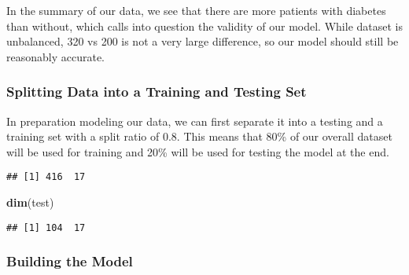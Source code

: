 \documentclass[
]{article}
\newenvironment{Shaded}{}{}
\newcommand{\DataTypeTok}[1]{\textcolor[rgb]{0.56,0.13,0.00}{#1}}
\newcommand{\DecValTok}[1]{\textcolor[rgb]{0.25,0.63,0.44}{#1}}
\newcommand{\FloatTok}[1]{\textcolor[rgb]{0.25,0.63,0.44}{#1}}
\newcommand{\KeywordTok}[1]{\textcolor[rgb]{0.00,0.44,0.13}{\textbf{#1}}}
\newcommand{\NormalTok}[1]{#1}
\newcommand{\OperatorTok}[1]{\textcolor[rgb]{0.40,0.40,0.40}{#1}}
\newcommand{\StringTok}[1]{\textcolor[rgb]{0.25,0.44,0.63}{#1}}
\begin{document}
In the summary of our data, we see that there are more patients with
diabetes than without, which calls into question the validity of our
model. While dataset is unbalanced, 320 vs 200 is not a very large
difference, so our model should still be reasonably accurate.

\hypertarget{header-n952}{%
\subsubsection{Splitting Data into a Training and Testing
Set}\label{header-n952}}

In preparation modeling our data, we can first separate it into a
testing and a training set with a split ratio of 0.8. This means that
80\% of our overall dataset will be used for training and 20\% will be
used for testing the model at the end.

\begin{Shaded}
\end{Shaded}

\begin{verbatim}
## [1] 416  17
\end{verbatim}

\begin{Shaded}
\begin{Highlighting}[]
\KeywordTok{dim}\NormalTok{(test)}
\end{Highlighting}
\end{Shaded}

\begin{verbatim}
## [1] 104  17
\end{verbatim}

\hypertarget{header-n958}{%
\subsubsection{Building the Model}\label{header-n958}}
\end{document}
